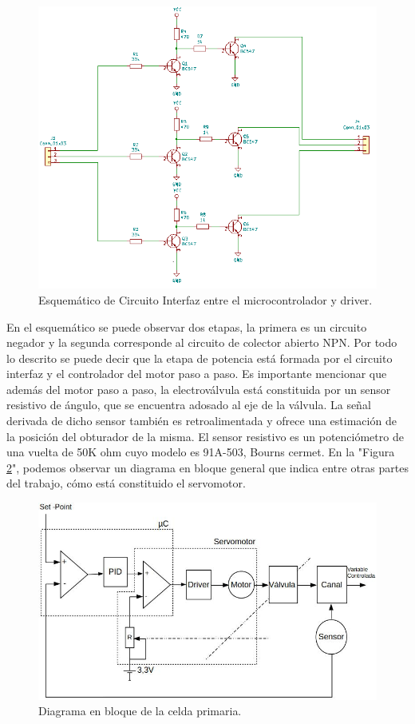\begin{figure}
\centering
\includegraphics[scale=.85]{./Figures/esquematico-circuito-interfaz.png}
\caption{Esquemático de Circuito Interfaz entre el microcontrolador y driver.}
\label{fig:esquemático circuito interfaz}
\end{figure}

En el esquemático se puede observar dos etapas, la primera es un circuito negador y la segunda corresponde al circuito de colector abierto NPN.
Por todo lo descrito se puede decir que la etapa de potencia está formada por el circuito interfaz y el controlador del motor paso a paso. 
Es importante mencionar que además del motor paso a paso, la electroválvula está constituida por un sensor resistivo de ángulo, que se encuentra adosado al eje de la válvula. La señal derivada de dicho sensor también es retroalimentada y ofrece una estimación de la posición del obturador de la misma. El sensor resistivo es un potenciómetro de una vuelta de 50K ohm cuyo modelo es 91A-503, Bourns cermet.
En la "Figura \ref{fig:Diagrama en bloque de la celda primaria}", podemos observar un diagrama en bloque general que indica entre otras partes del trabajo, cómo está constituido el servomotor.  

\begin{figure}
\centering
\includegraphics[scale=.65]{./Figures/Diagrama-en-bloque-general-con-servomotor-V2.jpg}
\caption{Diagrama en bloque de la celda primaria.}
\label{fig:Diagrama en bloque de la celda primaria}
\end{figure}
